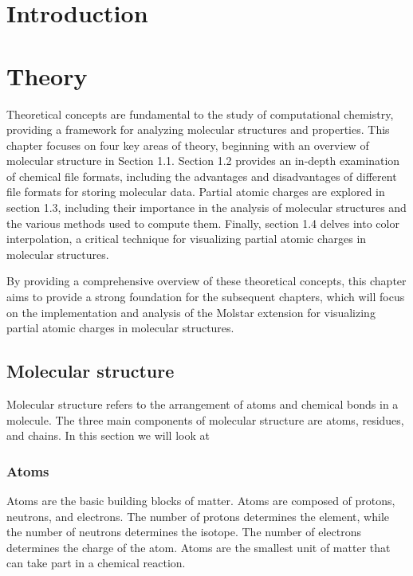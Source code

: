 \documentclass[
  digital,     %
  oneside,     %
  nosansbold,  %
  nocolorbold, %
  lof,         %
  lot,         %
]{fithesis4}
\begin{document}
\chapter*{Introduction}

\chapter{Theory}
\label{chapter:theory}

Theoretical concepts are fundamental to the study of computational chemistry, providing a framework for analyzing molecular structures and properties. This chapter focuses on four key areas of theory, beginning with an overview of molecular structure in Section 1.1. Section 1.2 provides an in-depth examination of chemical file formats, including the advantages and disadvantages of different file formats for storing molecular data. Partial atomic charges are explored in section 1.3, including their importance in the analysis of molecular structures and the various methods used to compute them. Finally, section 1.4 delves into color interpolation, a critical technique for visualizing partial atomic charges in molecular structures.

By providing a comprehensive overview of these theoretical concepts, this chapter aims to provide a strong foundation for the subsequent chapters, which will focus on the implementation and analysis of the Molstar extension for visualizing partial atomic charges in molecular structures.

\section{Molecular structure}
\label{section:molecular_structure}

Molecular structure refers to the arrangement of atoms and chemical bonds in a molecule. The three main components of molecular structure are atoms, residues, and chains.
In this section we will look at

\subsection{Atoms}
\label{subsection:atoms}

Atoms are the basic building blocks of matter. Atoms are composed of protons, neutrons, and electrons. The number of protons determines the element, while the number of neutrons determines the isotope. The number of electrons determines the charge of the atom. Atoms are the smallest unit of matter that can take part in a chemical reaction.
\end{document}
